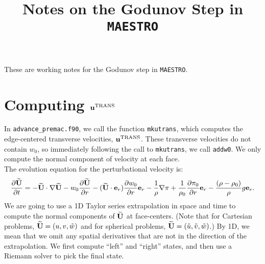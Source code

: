 \documentclass[11pt]{article}
\title{Notes on the Godunov Step in {\tt MAESTRO}}
\def\trans {\rm TRANS}
\def\eb    {{\bf e}}
\def\ub    {{\bf u}}
\def\Ubt   {\widetilde{\bf U}}
\def\ut    {\tilde{u}}
\def\vt    {\tilde{v}}
\def\wt    {\tilde{w}}
\begin{document}
\maketitle

These are working notes for the Godunov step in {\tt MAESTRO}.

\section{Computing $\ub^{\trans}$}
In {\tt advance\_premac.f90}, we call the function {\tt mkutrans}, which computes the edge-centered transverse velocities, $\ub^{\trans}$.  These transverse velocities do not contain $w_0$, so immediately following the call to {\tt mkutrans}, we call {\tt addw0}.  We only compute the normal component of velocity at each face.\\

The evolution equation for the perturbational velocity is:
\begin{equation}
\frac{\partial\Ubt}{\partial t} = -\Ubt\cdot\nabla\Ubt - w_0\frac{\partial\Ubt}{\partial r} - (\Ubt\cdot\eb_r)\frac{\partial w_0}{\partial r}\eb_r - \frac{1}{\rho}\nabla\pi + \frac{1}{\rho_0}\frac{\partial\pi_0}{\partial r}\eb_r - \frac{(\rho-\rho_0)}{\rho}g\eb_r.
\end{equation}
We are going to use a 1D Taylor series extrapolation in space and time to compute the normal components of $\Ubt$ at face-centers.  (Note that for Cartesian problems, $\Ubt = (u,v,\wt)$ and for spherical problems, $\Ubt = (\ut,\vt,\wt)$.)  By 1D, we mean that we omit any spatial derivatives that are not in the direction of the extrapolation.  We first compute ``left'' and ``right'' states, and then use a Riemann solver to pick the final state.\\
\end{document}
